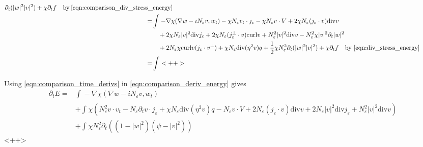 \documentclass[a4paper]{article}
\newcommand{\curl}{\mathrm{curl}}
\renewcommand{\div}{\mathrm{div}}
\begin{document}
\begin{align}
  \partial_t( |w|^2 |v|^2 ) + \chi \partial_t f \quad \parbox{5cm}{by \eqref{eqn:comparison_div_stress_energy}} \nonumber \\
  = &\int_{}^{} -\nabla \chi ( \nabla w - i N_\varepsilon v, w_t) - \chi N_\varepsilon v_t \cdot j_\varepsilon - \chi N_\varepsilon v \cdot V + 2 \chi N_\varepsilon (
  j_\varepsilon \cdot v) \div v \nonumber \\
  &\quad + 2 \chi N_\varepsilon |v|^2 \div j_\varepsilon + 2 \chi N_\varepsilon (j_\varepsilon^\perp \cdot v ) \curl v + N_\varepsilon^2 |v|^2 \div v
  - N_\varepsilon^2 \chi |v|^2 \partial_t |w|^2 \nonumber \\
  &\quad + 2 N_\varepsilon \chi \curl v ( j_\varepsilon \cdot v^\perp) + \chi N_\varepsilon \div(\eta^2 v )q + \frac{1}{2} \chi N_\varepsilon^2
  \partial_t( |w|^2 |v|^2) + \chi \partial_t f \quad \parbox{5cm}{by \eqref{eqn:div_stress_energy}} \nonumber \\
  = &\int_{}^{}<++>
  \label{eqn:comparison_deriv_energy}
\end{align}

Using \eqref{eqn:comparison_time_derivs} in \eqref{eqn:comparison_deriv_energy} gives
\begin{align}
  \partial_t E = &\int_{}^{} -\nabla \chi ( \nabla w - i N_\varepsilon v, w_t) \nonumber \\
  &+ \int_{}^{} \chi \left( N_\varepsilon^2 v \cdot v_t - N_\varepsilon \partial_t v \cdot j_\varepsilon + \chi N_\varepsilon \div(\eta^2 v )q - N_\varepsilon v \cdot V + 2 N_\varepsilon
  (j_\varepsilon \cdot v) \div v + 2 N_\varepsilon |v|^2 \div j_\varepsilon + N_\varepsilon^2 |v|^2 \div v \right) \nonumber \\
  &+ \int_{}^{} \chi N_\varepsilon^2 \partial_t ( (1-|w|^2)(\psi-|v|^2) )
  \label{<++>}
\end{align}<++>
\end{document}
